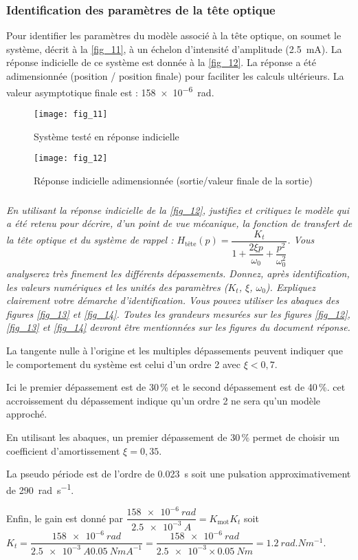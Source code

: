 \subsubsection{Identification des paramètres de la tête optique}

\ifprof
\else

Pour identifier les paramètres du modèle associé à la tête optique, on soumet le système, décrit à la \autoref{fig_11}, à un échelon d’intensité d’amplitude (\SI{2,5}{mA}). La
réponse indicielle de ce système est donnée à la \autoref{fig_12}. La réponse a été adimensionnée (position / position
finale) pour faciliter les calculs ultérieurs. La valeur asymptotique finale est : \SI{158e-6}{rad}.


\begin{figure}[H]
\centering
\texttt{[image: fig\_11]}
\caption{\label{fig_11} Système testé en réponse indicielle}
\end{figure}


\begin{figure}[H]
\centering
\texttt{[image: fig\_12]}
\caption{\label{fig_12} Réponse indicielle adimensionnée (sortie/valeur finale de la sortie)}
\end{figure}
\fi


\subparagraph{\label{q_10}}\textit{En utilisant la réponse indicielle de la \autoref{fig_12}, justifiez et critiquez le modèle qui a été retenu pour décrire, d’un point de vue mécanique, la fonction de transfert de la tête optique et du système de rappel :
$H_{\text{tête}}(p)=\dfrac{K_t}{1+\dfrac{2\xi p}{\omega_0}+\dfrac{p^2}{\omega_0^2}}$. Vous analyserez très finement les différents dépassements. Donnez, après identification, les valeurs numériques et les unités des paramètres ($K_t$, $\xi$, $\omega_0$).
Expliquez clairement votre démarche d’identification. Vous pouvez utiliser les abaques des figures
\autoref{fig_13} et \autoref{fig_14}. Toutes les grandeurs mesurées sur les figures \autoref{fig_12}, \autoref{fig_13} et \autoref{fig_14} devront être mentionnées sur les
figures du document réponse.}
\ifprof
\begin{corrige}
La tangente nulle à l'origine et les multiples dépassements peuvent indiquer que le comportement du système est celui d'un ordre 2 avec $\xi<0,7$.

Ici le premier dépassement est de 30\,\% et le second dépassement est de 40\,\%. cet accroissement du dépassement indique qu'un ordre 2 ne sera qu'un modèle approché. 

En utilisant les abaques, un premier dépassement de 30\,\% permet de choisir un coefficient d'amortissement $\xi =0,35$. 

La pseudo période est de l'ordre de \SI{0,023}{s} soit une pulsation approximativement de \SI{290}{rad.s^{-1}}.

Enfin, le gain est donné  par $ \dfrac{ \SI{158e-6}{rad}}{\SI{2,5e-3}{A}}=K_{\text{mot}} K_t $ soit 
$  K_t = \dfrac{ \SI{158e-6}{rad}}{\SI{2,5e-3}{A}\SI{0,05}{NmA^{-1}}}= \dfrac{ \SI{158e-6}{rad}}{\num{2,5e-3}\times \SI{0,05}{Nm}} =\SI{1,2}{rad.Nm^{-1}}$.
\end{corrige}
\else
\fi


